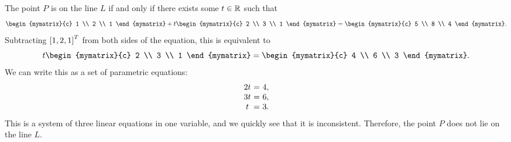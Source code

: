 \begin{solution}
  The point $P$ is on the line $L$ if and only if there exists some
  $t\in\mathbb{R}$ such that
  \begin{equation*}
    \begin{mymatrix}{c} 1 \\ 2 \\ 1 \end{mymatrix}
    + t \begin{mymatrix}{c} 2 \\ 3 \\ 1 \end{mymatrix}
    = \begin{mymatrix}{c} 5 \\ 8 \\ 4 \end{mymatrix}.
  \end{equation*}
  Subtracting $\left[1,2,1\right]^T$ from both sides of the equation, this is
  equivalent to
  \begin{equation*}
    t \begin{mymatrix}{c} 2 \\ 3 \\ 1 \end{mymatrix}
    = \begin{mymatrix}{c} 4 \\ 6 \\ 3 \end{mymatrix}.
  \end{equation*}
  We can write this as a set of parametric equations:
  \begin{equation*}
    \begin{array}{c@{~}c@{~}l}
      2t &=& 4, \\
      3t &=& 6, \\
      t &=& 3.
    \end{array}
  \end{equation*}
  This is a system of three linear equations in one variable, and we
  quickly see that it is inconsistent. Therefore, the point $P$ does
  not lie on the line $L$.
\end{solution}

